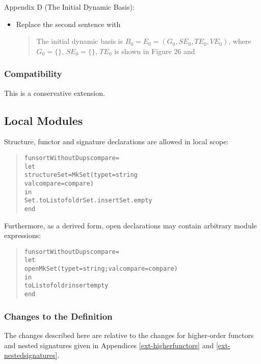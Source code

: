 \documentclass[twoside,titlepage]{article}
\begin{document}
\begin{appendix}
Appendix D (The Initial Dynamic Basis):
\begin{itemize}
\item Replace the second sentence with
  \begin{quote}
  The initial dynamic basis is $B_0 = E_0 = (G_0,\mathit{SE}_0,\mathit{TE}_0,\mathit{VE}_0)$, where $G_0=\{\}$, $\mathit{SE}_0 = \{\}$, $\mathit{TE}_0$ is shown in Figure 26 and
  \end{quote}
\end{itemize}


\subsubsection*{Compatibility}

This is a conservative extension.


\subsection{Local Modules}
\label{ext-localmodules}

Structure, functor and signature declarations are allowed in local scope:
\begin{quote}
\begin{alltt}
fun sortWithoutDups compare =
    let
        structure Set = MkSet(type t = string
                              val compare = compare)
    in
        Set.toList o foldr Set.insert Set.empty
    end
\end{alltt}
\end{quote}
Furthermore, as a derived form, open declarations may contain arbitrary module expressions:
\begin{quote}
\begin{alltt}
fun sortWithoutDups compare =
    let
        open MkSet(type t = string; val compare = compare)
    in
        toList o foldr insert empty
    end
\end{alltt}
\end{quote}


\subsubsection*{Changes to the Definition}

The changes described here are relative to the changes for higher-order functors and nested signatures given in Appendices \ref{ext-higherfunctors} and \ref{ext-nestedsignatures}.


\end{appendix}
\end{document}
